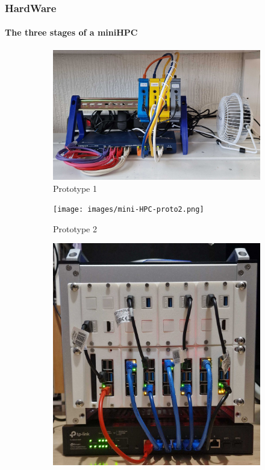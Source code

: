\begin{frame}
	\frametitle{HardWare}
	\framesubtitle{The three stages of a miniHPC}
	
	\begin{figure}
		\centering
		\begin{subfigure}[b]{0.24\textwidth}
			\centering
			\includegraphics[width=\textwidth]{images/mini-HPC-proto1.png}
			\caption{Prototype 1}
			\label{fig:2.a}
		\end{subfigure}
		\hfill
		\begin{subfigure}[b]{0.24\textwidth}
			\centering
			\texttt{[image: images/mini-HPC-proto2.png]}
			\caption{Prototype 2}
			\label{fig:2.b}
		\end{subfigure}
		\hfill
		\begin{subfigure}[b]{0.24\textwidth}
			\centering
			\includegraphics[width=\textwidth]{images/mini-HPC-proto3.png}

\end{subfigure}
\end{figure}
\end{frame}
